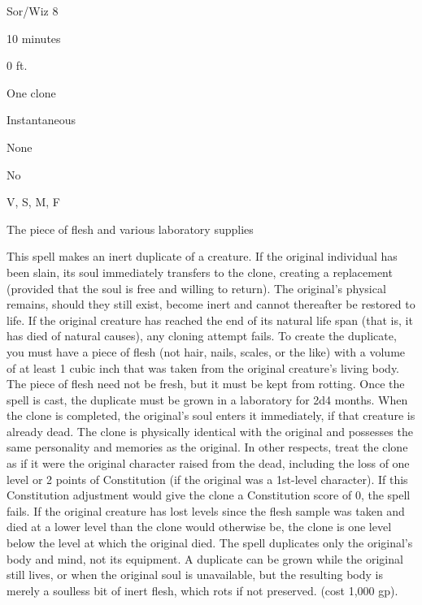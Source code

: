 
\begin{description*}
\item[Level:] Sor/Wiz 8
\item[Casting Time:] 10 minutes
\item[Range:] 0 ft.
\item[Effect:] One clone
\item[Duration:] Instantaneous
\item[Saving Throw:] None
\item[Spell Resistance:] No
\item[Components:] V, S, M, F
\item[Arcane Material Component:] The piece of flesh and various laboratory supplies
\end{description*}

This spell makes an inert duplicate of a creature. If the original individual has
been slain, its soul immediately transfers to the clone, creating a replacement
(provided that the soul is free and willing to return). The original's physical
remains, should they still exist, become inert and cannot thereafter be restored
to life. If the original creature has reached the end of its natural life span
(that is, it has died of natural causes), any cloning attempt fails.
To create the duplicate, you must have a piece of flesh (not hair, nails, scales,
or the like) with a volume of at least 1 cubic inch that was taken from the original
creature's living body. The piece of flesh need not be fresh, but it must be kept
from rotting. Once the spell is cast, the duplicate must be grown in a laboratory
for 2d4 months.
When the clone is completed, the original's soul enters it immediately, if that
creature is already dead. The clone is physically identical with the original and
possesses the same personality and memories as the original. In other respects,
treat the clone as if it were the original character raised from the dead, including
the loss of one level or 2 points of Constitution (if the original was a 1st-level
character). If this Constitution adjustment would give the clone a Constitution
score of 0, the spell fails. If the original creature has lost levels since the
flesh sample was taken and died at a lower level than the clone would otherwise
be, the clone is one level below the level at which the original died.
The spell duplicates only the original's body and mind, not its equipment.
A duplicate can be grown while the original still lives, or when the original soul
is unavailable, but the resulting body is merely a soulless bit of inert flesh,
which rots if not preserved.
(cost 1,000 gp).